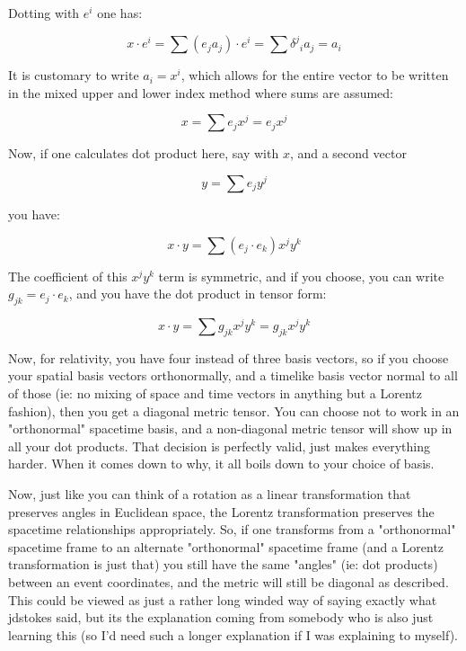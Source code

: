 Dotting with $e^i$ one has:

\begin{equation*}
x \cdot e^i = \sum (e_j a_j) \cdot e^i = \sum {\delta^j}_i a_j = a_i
\end{equation*}

It is customary to write $a_i = x^i$, which allows for the entire vector to
be written in the mixed upper and lower index method where sums are assumed:

\begin{equation*}
x = \sum e_j x^j = e_j x^j
\end{equation*}

Now, if one calculates dot product here, say with $x$, and a second vector

\begin{equation*}
y = \sum e_j y^j
\end{equation*}

you have:

\begin{equation*}
x \cdot y = \sum (e_j \cdot e_k) x^j y^k
\end{equation*}

The coefficient of this $x^j y^k$ term is symmetric, and if you choose, you
can write $g_{jk} = e_j \cdot e_k$, and you have the dot product in 
tensor form:

\begin{equation*}
x \cdot y = \sum g_{jk} x^j y^k = g_{jk} x^j y^k
\end{equation*}

Now, for relativity, you have four instead of three basis vectors, so if you choose your spatial basis vectors orthonormally, and a timelike basis vector normal to all of those (ie: no mixing of space and time vectors in anything but a Lorentz fashion), then you get a diagonal metric tensor.  You can choose not to work in an "orthonormal" spacetime basis, and a non-diagonal metric tensor will show up in all your dot products.  That decision is perfectly valid, just makes everything harder.  When it comes down to why, it all boils down to your choice of basis.

Now, just like you can think of a rotation as a linear transformation that preserves angles in Euclidean space, the Lorentz transformation preserves the spacetime relationships appropriately.  So, if one transforms from a "orthonormal" spacetime frame to an alternate "orthonormal" spacetime frame (and a Lorentz transformation is just that) you still have the same "angles" (ie: dot products) between an event coordinates, and the metric will still be diagonal as described.  This could be viewed as just a rather long winded way of saying exactly what jdstokes said, but its the explanation coming from somebody who is also just learning this (so I'd need such a longer explanation if I was explaining to myself).

